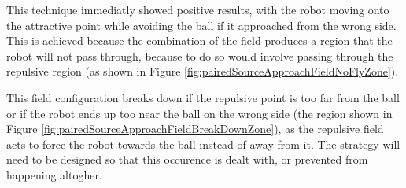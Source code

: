 \documentclass[10pt]{article}
\begin{document}
This technique immediatly showed positive results, with the robot moving onto
the attractive point while avoiding the ball if it approached from the wrong
side. This is achieved because the combination of the field produces a region
that the robot will not pass through, because to do so would involve passing
through the repulsive region (as shown in Figure
\ref{fig:pairedSourceApproachFieldNoFlyZone}).  

This field configuration breaks down if the repulsive point is too far from the
ball or if the robot ends up too near the ball on the wrong side (the region
shown in Figure \ref{fig:pairedSourceApproachFieldBreakDownZone}), as the
repulsive field acts to force the robot towards the ball instead of away from
it.  The strategy will need to be designed so that this occurence is dealt with,
or prevented from happening altogher.
\end{document}
